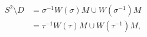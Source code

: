 \documentclass[preview]{standalone}
\begin{document}
\begin{align*}
S^2 \setminus D &= \sigma^{-1} W(\sigma) M \cup W(\sigma^{-1}) M \\ &= \tau^{-1} W(\tau) M \cup W(\tau^{-1}) M,
\end{align*}
\end{document}

